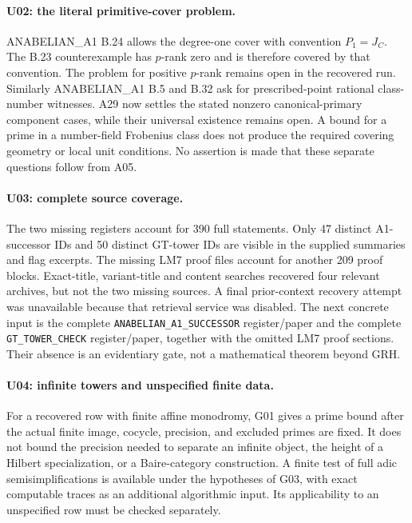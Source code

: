 \paragraph{U02: the literal primitive-cover problem.}
ANABELIAN\_A1 B.24 allows the degree-one cover with convention
$P_1=J_C$. The B.23 counterexample has $p$-rank zero and is therefore
covered by that convention. The problem for positive $p$-rank
remains open in the recovered run. Similarly ANABELIAN\_A1 B.5 and
B.32 ask for prescribed-point rational class-number witnesses. A29
now settles the stated nonzero canonical-primary component cases,
while their universal existence remains open.
A bound for a prime in a number-field Frobenius class does not
produce the required covering geometry or local unit conditions.
No assertion is made that these separate questions follow from A05.

\paragraph{U03: complete source coverage.}
The two missing registers account for 390 full statements. Only
47 distinct A1-successor IDs and 50 distinct GT-tower IDs are visible
in the supplied summaries and flag excerpts. The missing LM7
proof files account for another 209 proof blocks. Exact-title,
variant-title and content searches recovered four relevant archives,
but not the two missing sources. A final prior-context recovery
attempt was unavailable because that retrieval service was disabled.
The next concrete input is the complete
\texttt{ANABELIAN\_A1\_SUCCESSOR} register/paper and the complete
\texttt{GT\_TOWER\_CHECK} register/paper, together with the omitted
LM7 proof sections. Their absence is an evidentiary gate, not a
mathematical theorem beyond GRH.

\paragraph{U04: infinite towers and unspecified finite data.}
For a recovered row with finite affine monodromy, G01 gives a
prime bound after the actual finite image, cocycle, precision,
and excluded primes are fixed. It does not bound the precision
needed to separate an infinite object, the height of a Hilbert
specialization, or a Baire-category construction. A finite test of
full adic semisimplifications is available under the hypotheses of
G03, with exact computable traces as an additional algorithmic input.
Its applicability to an unspecified row must be checked separately.

